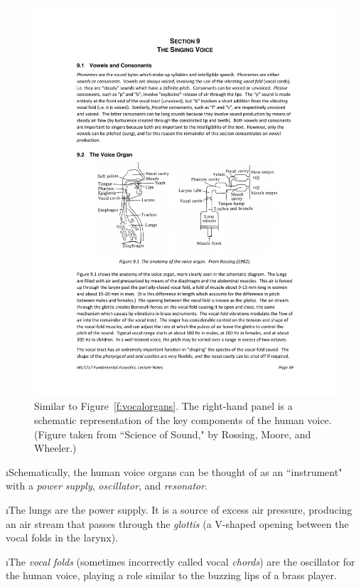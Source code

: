 \begin{figure}[htbp]
\begin{center}
\includegraphics[width=\textwidth]{vocalorgans_schematic}
\caption{
Similar to Figure~\ref{f:vocalorgans}.
The right-hand panel is a schematic
representation of the key components of the human voice.
(Figure taken from 
``Science of Sound," by Rossing, Moore, and Wheeler.)}
\label{f:vocalorgans_schematic}
\end{center}
\end{figure}
%

\i Schematically, the human voice organs can be 
thought of as an ``instrument" with a 
{\em power supply}, {\em oscillator}, and 
{\em resonator}.

\i The lungs are the power supply.
It is a source of excess air pressure, producing an air 
stream that passes through the {\em glottis} 
(a V-shaped opening between the vocal folds in the larynx).

\i The {\em vocal folds} (sometimes incorrectly 
called vocal {\em chords}) are the oscillator 
for the human voice, playing a role similar to the 
buzzing lips of a brass player.

